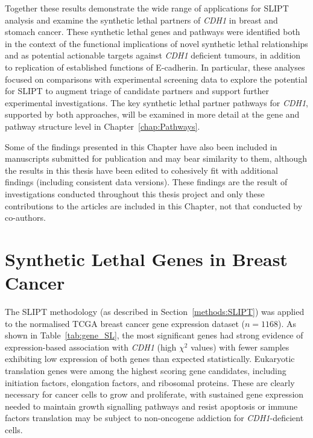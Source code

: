 Together these results demonstrate the wide range of applications for \gls{SLIPT} analysis and examine the synthetic lethal partners of \textit{CDH1} in breast and stomach cancer. These synthetic lethal genes and pathways were identified both in the context of the functional implications of novel synthetic lethal relationships and as potential actionable targets against \textit{CDH1} deficient tumours, in addition to replication of established functions of E-cadherin. In particular, these analyses focused on comparisons with experimental screening data to explore the potential for \gls{SLIPT} to augment triage of candidate partners and support further experimental investigations. The key synthetic lethal partner pathways for \textit{CDH1}, supported by both approaches, will be examined in more detail at the gene and pathway structure level in Chapter~\ref{chap:Pathways}.

Some of the findings presented in this Chapter have also been included in manuscripts submitted for publication \citep{KellyHDGC, KellyBMC} and may bear similarity to them, although the results in this thesis have been edited to cohesively fit with additional findings (including consistent data versions). These findings are the result of investigations conducted throughout this thesis project and only these contributions to the articles are included in this Chapter, not that conducted by co-authors.

\section{Synthetic Lethal Genes in Breast Cancer} \label{chapt3:exprSL_genes}

The \gls{SLIPT} methodology (as described in Section~\ref{methods:SLIPT}) was applied to the normalised TCGA breast cancer gene expression dataset ($n = 1168$). As shown in Table~\ref{tab:gene_SL}, the most significant genes had strong evidence of expression-based association with \textit{CDH1} (high $\chi^2$ values) with fewer samples exhibiting low expression of both genes than expected statistically. Eukaryotic translation genes were among the highest scoring gene candidates, including initiation factors, elongation factors, and ribosomal proteins. These are clearly necessary for cancer cells to grow and proliferate, with sustained gene expression needed to maintain growth signalling pathways and resist apoptosis or immune factors translation may be subject to non-oncogene addiction for \textit{CDH1}-deficient cells.

